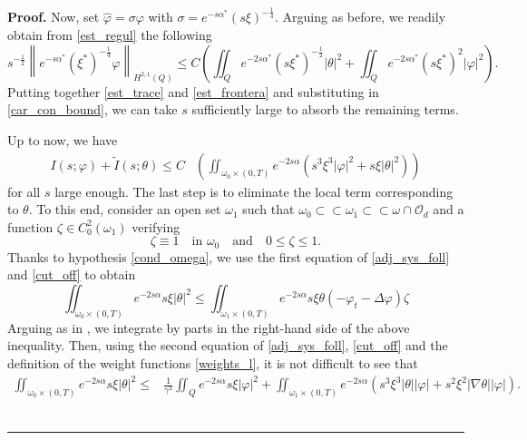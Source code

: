 \documentclass[preprint,10pt]{article}
\newenvironment{proof}[1][Proof]{\noindent\textbf{#1.} }{\ \rule{0.5em}{0.5em}}
\numberwithin{equation}{section}
\numberwithin{theorem}{section}
\begin{document}
{\begin{proof}
Now, set $\widehat \varphi=\sigma \varphi$ with $\sigma=e^{-s\alpha^*}(s\xi)^{-\frac{1}{4}}$. Arguing as before, we readily obtain from \eqref{est_regul} the following 
%
\begin{equation}\label{est_frontera}
s^{-\frac{1}{2}}\left\| e^{-s\alpha^*}(\xi^*)^{-\frac{1}{4}} \varphi \right\|_{H^{2,1}(Q)}\leq C\left(\iint_{Q}e^{-2s\alpha^*}(s\xi^*)^{-\frac{1}{2}}|\theta|^2+\iint_{Q}e^{-2s\alpha^*}(s\xi^*)^2|\varphi|^2\right).
\end{equation}
%
Putting together \eqref{est_trace} and \eqref{est_frontera} and substituting in \eqref{car_con_bound}, we can take $s$ sufficiently large to absorb the remaining terms. 

Up to now, we have 
%
\begin{equation}\label{est_locales}
\begin{split}
I(s;\varphi)+\widetilde{I}(s;\theta)\leq C&\left(\iint_{\omega_0\times(0,T)}e^{-2s\alpha}\left(s^3\xi^3|\varphi|^2+s\xi|\theta|^2\right) \right)
\end{split}
\end{equation}
%
for all $s$ large enough. The last step is to eliminate the local term corresponding to $\theta$. To this end, consider an open set $\omega_1$ such that $\omega_0\subset\subset\omega_1\subset \subset \omega\cap \mathcal O_d$ and a function $\zeta\in C_0^2(\omega_1)$ verifying 
%
\begin{equation}\label{cut_off}
\zeta\equiv 1\quad \text{in } \omega_0 \quad \text{and} \quad 0\leq \zeta\leq 1. 
\end{equation}
%
Thanks to hypothesis \eqref{cond_omega}, we use the first equation of \eqref{adj_sys_foll} and \eqref{cut_off} to obtain
%
\begin{equation}
\iint_{\omega_0\times(0,T)}e^{-2s\alpha}s\xi|\theta|^2\leq \iint_{\omega_1\times(0,T)}e^{-2s\alpha}s\xi \theta(-\varphi_t-\Delta \varphi)\zeta
\end{equation}
%
Arguing as in \cite{luz_manuel,deteresa2000,b_gb_r_2}, we integrate by parts in the right-hand side of the above inequality. Then, using the second equation of \eqref{adj_sys_foll}, \eqref{cut_off} and the definition of the weight functions \eqref{weights_l}, it is not difficult to see that 
%
\begin{equation}
\begin{split}
\iint_{\omega_0\times(0,T)}e^{-2s\alpha}s\xi|\theta|^2\leq& \frac{1}{\gamma^2}\iint_{Q}e^{-2s\alpha}s\xi |\varphi|^2+\iint_{\omega_1\times(0,T)}e^{-2s\alpha}\left(s^3\xi^3|\theta| |\varphi|+s^2\xi^2|\nabla \theta||\varphi|\right).

\end{split}
\end{equation}
\end{proof}}
\end{document}
